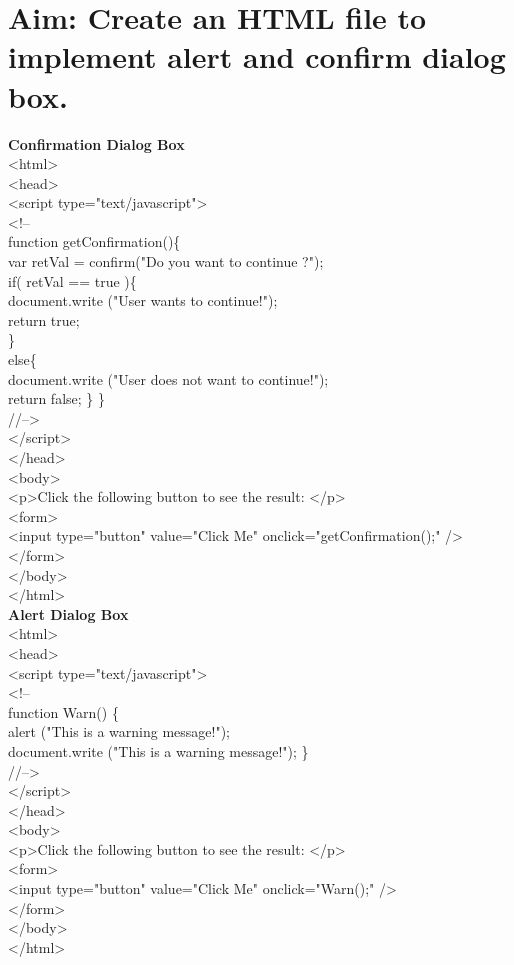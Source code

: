 \section*{\fontsize{16}{14}\selectfont Aim: Create an HTML file to implement alert and confirm dialog box. }
\textbf{Confirmation Dialog Box}\\
<html>\\
<head>\\
<script type="text/javascript">\\
<!--\\
function getConfirmation()\{\\
var retVal = confirm("Do you want to continue ?");\\
               if( retVal == true )\{\\
                  document.write ("User wants to continue!");\\
                  return true;\\
               \}\\
               else\{\\
                  document.write ("User does not want to continue!");\\
                  return false; \} \}\\
         //-->\\
      </script>\\
   </head>\\
   <body>\\
      <p>Click the following button to see the result: </p>\\
      <form>\\
         <input type="button" value="Click Me" onclick="getConfirmation();" />\\
      </form>\\
   </body>\\
</html>\\


\textbf{Alert Dialog Box}\\
<html>\\
<head>\\
<script type="text/javascript">\\
<!--\\
function Warn() \{\\
alert ("This is a warning message!");\\
document.write ("This is a warning message!"); \}\\
//-->\\
</script>\\
</head>\\
<body>\\
<p>Click the following button to see the result: </p>\\
<form>\\
<input type="button" value="Click Me" onclick="Warn();" />\\
</form>\\
</body>\\
</html>



